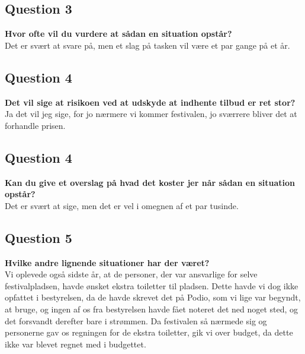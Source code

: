 \subsection{Question 3}
\label{sub:i4q4}
\noindent \textbf{Hvor ofte vil du vurdere at sådan en situation opstår?}
\\
Det er svært at svare på, men et slag på tasken vil være et par gange på et år.

\subsection{Question 4}
\label{sub:i4q5}
\noindent \textbf{Det vil sige at risikoen ved at udskyde at indhente tilbud er ret stor?}
\\
Ja det vil jeg sige, for jo nærmere vi kommer festivalen, jo sværrere bliver det at forhandle prisen.

\subsection{Question 4}
\label{sub:i4q5}
\noindent \textbf{Kan du give et overslag på hvad det koster jer når sådan en situation opstår?}
\\
Det er svært at sige, men det er vel i omegnen af et par tusinde.

\subsection{Question 5}
\label{sub:i4q3}
\noindent \textbf{Hvilke andre lignende situationer har der været?}
\\
Vi oplevede også sidste år, at de personer, der var ansvarlige for selve festivalpladsen, havde
ønsket ekstra toiletter til pladsen. Dette havde vi dog ikke opfattet i bestyrelsen, da de havde
skrevet det på Podio, som vi lige var begyndt, at bruge, og ingen af os fra bestyrelsen havde fået
noteret det ned noget sted, og det forsvandt derefter bare i strømmen. Da festivalen så nærmede sig
og personerne gav os regningen for de ekstra toiletter, gik vi over budget, da dette ikke var blevet
regnet med i budgettet.
